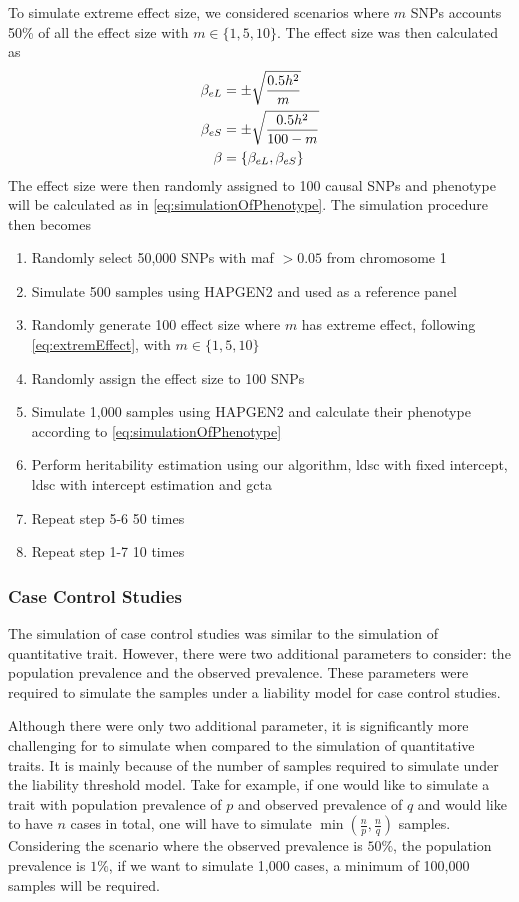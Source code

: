 		To simulate extreme effect size, we considered scenarios where $m$ \glspl{SNP} accounts 50\% of all the effect size with $m\in\{1,5,10\}$.
		The effect size was then calculated as
		\begin{align}
		\beta_{eL} &= \pm\sqrt{\frac{0.5h^2}{m}} \notag\\
		\beta_{eS} &= \pm\sqrt{\frac{0.5h^2}{100-m}} \notag\\
		\beta &= \{\beta_{eL}, \beta_{eS}\}
		\label{eq:extremEffect}
		\end{align}
		The effect size were then randomly assigned to 100 causal \glspl{SNP} and phenotype will be calculated as in \cref{eq:simulationOfPhenotype}.
		The simulation procedure then becomes
		\begin{enumerate}
			\item Randomly select 50,000 \glspl{SNP} with \gls{maf} $>0.05$ from chromosome 1
			\item Simulate 500 samples using HAPGEN2 and used as a reference panel
			\item Randomly generate 100 effect size where $m$ has extreme effect, following \cref{eq:extremEffect}, with $m\in\{1,5,10\}$
			\item Randomly assign the effect size to 100 \glspl{SNP}
			\item Simulate 1,000 samples using HAPGEN2 and calculate their phenotype according to \cref{eq:simulationOfPhenotype}
			\item Perform heritability estimation using our algorithm, \gls{ldsc} with fixed intercept, \gls{ldsc} with intercept estimation and \gls{gcta}
			\item Repeat step 5-6 50 times
			\item Repeat step 1-7 10 times
		\end{enumerate}
		
		\subsubsection{Case Control Studies}
		The simulation of case control studies was similar to the simulation of quantitative trait. 
		However, there were two additional parameters to consider: the population prevalence and the observed prevalence.
		These parameters were required to simulate the samples under a liability model for case control studies.

		Although there were only two additional parameter, it is significantly more challenging for to simulate when compared to the simulation of quantitative traits.
		It is mainly because of the number of samples required to simulate under the liability threshold model.
		Take for example, if one would like to simulate a trait with population prevalence of $p$ and observed prevalence of $q$ and would like to have $n$ cases in total, one will have to simulate $\min(\frac{n}{p}, \frac{n}{q})$ samples.
		Considering the scenario where the observed prevalence is $50\%$, the population prevalence is $1\%$, if we want to simulate 1,000 cases, a minimum of 100,000 samples will be required.
		
